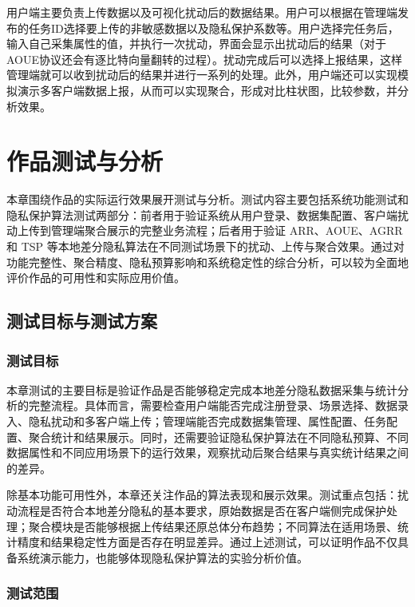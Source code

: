 \documentclass{cumcmthesis}
\numberwithin{equation}{section}
\numberwithin{figure}{section}
\numberwithin{table}{section}
\begin{document}
用户端主要负责上传数据以及可视化扰动后的数据结果。用户可以根据在管理端发布的任务ID选择要上传的非敏感数据以及隐私保护系数等。用户选择完任务后，输入自己采集属性的值，并执行一次扰动，界面会显示出扰动后的结果（对于AOUE协议还会有逐比特向量翻转的过程）。扰动完成后可以选择上报结果，这样管理端就可以收到扰动后的结果并进行一系列的处理。此外，用户端还可以实现模拟演示多客户端数据上报，从而可以实现聚合，形成对比柱状图，比较参数，并分析效果。

\clearpage
\section{作品测试与分析}

本章围绕作品的实际运行效果展开测试与分析。测试内容主要包括系统功能测试和隐私保护算法测试两部分：前者用于验证系统从用户登录、数据集配置、客户端扰动上传到管理端聚合展示的完整业务流程；后者用于验证 ARR、AOUE、AGRR 和 TSP 等本地差分隐私算法在不同测试场景下的扰动、上传与聚合效果。通过对功能完整性、聚合精度、隐私预算影响和系统稳定性的综合分析，可以较为全面地评价作品的可用性和实际应用价值。

\subsection{测试目标与测试方案}

\subsubsection{测试目标}

本章测试的主要目标是验证作品是否能够稳定完成本地差分隐私数据采集与统计分析的完整流程。具体而言，需要检查用户端能否完成注册登录、场景选择、数据录入、隐私扰动和多客户端上传；管理端能否完成数据集管理、属性配置、任务配置、聚合统计和结果展示。同时，还需要验证隐私保护算法在不同隐私预算、不同数据属性和不同应用场景下的运行效果，观察扰动后聚合结果与真实统计结果之间的差异。

除基本功能可用性外，本章还关注作品的算法表现和展示效果。测试重点包括：扰动流程是否符合本地差分隐私的基本要求，原始数据是否在客户端侧完成保护处理；聚合模块是否能够根据上传结果还原总体分布趋势；不同算法在适用场景、统计精度和结果稳定性方面是否存在明显差异。通过上述测试，可以证明作品不仅具备系统演示能力，也能够体现隐私保护算法的实验分析价值。

\subsubsection{测试范围}
\end{document}
